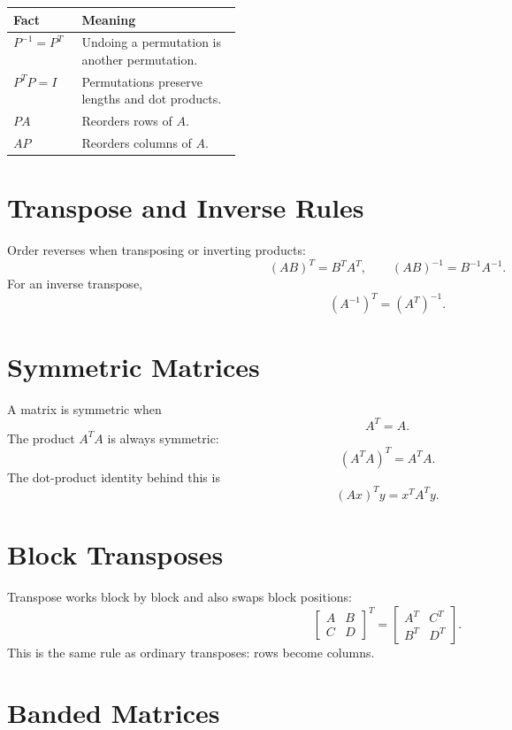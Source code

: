 \documentclass[10pt]{article}
\begin{document}
\begin{center}
\small
\begin{tabularx}{\linewidth}{@{}L{0.30\linewidth}Y@{}}
\toprule
Fact & Meaning \\
\midrule
\(P^{-1}=P^{T}\) & Undoing a permutation is another permutation. \\
\(P^{T}P=I\) & Permutations preserve lengths and dot products. \\
\(PA\) & Reorders rows of \(A\). \\
\(AP\) & Reorders columns of \(A\). \\
\bottomrule
\end{tabularx}
\end{center}

\section{Transpose and Inverse Rules}

Order reverses when transposing or inverting products:
\[
(AB)^{T}=B^{T}A^{T},
\qquad
(AB)^{-1}=B^{-1}A^{-1}.
\]
For an inverse transpose,
\[
(A^{-1})^{T}=(A^{T})^{-1}.
\]


\section{Symmetric Matrices}

A matrix is symmetric when
\[
A^{T}=A.
\]
The product \(A^{T}A\) is always symmetric:
\[
(A^{T}A)^{T}=A^{T}A.
\]
The dot-product identity behind this is
\[
(Ax)^{T}y=x^{T}A^{T}y.
\]

\section{Block Transposes}

Transpose works block by block and also swaps block positions:
\[
\begin{bmatrix}
A&B\\
C&D
\end{bmatrix}^{T}
=
\begin{bmatrix}
A^{T}&C^{T}\\
B^{T}&D^{T}
\end{bmatrix}.
\]
This is the same rule as ordinary transposes: rows become columns.

\section{Banded Matrices}
\end{document}
